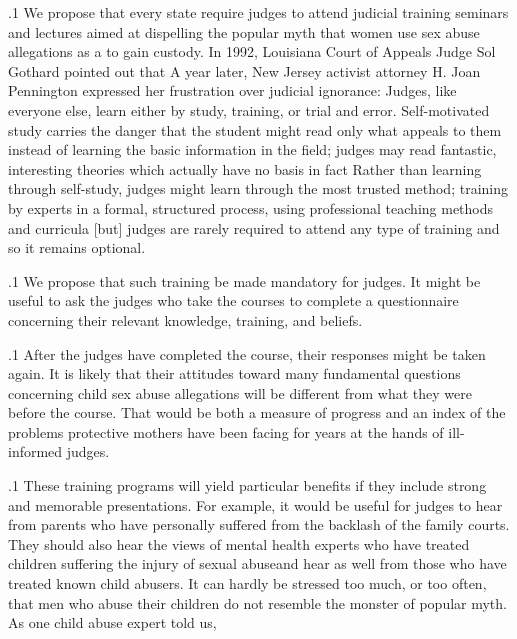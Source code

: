 \documentclass[11pt, twoside]{article}
\begin{document}
{\p.1{%
\noindent{}We propose that every state require judges to attend judicial training
seminars and lectures aimed at dispelling the popular myth that women
use sex abuse allegations as a  to gain custody. In 1992,
Louisiana Court of Appeals Judge Sol Gothard pointed out that  A year later, New Jersey activist
attorney H. Joan Pennington
expressed her frustration over judicial ignorance:
Judges, like everyone else, learn either by study, training, or trial
and error. Self-motivated study carries the danger that the student
might read only what appeals to them instead of learning the basic information in the field; judges may read fantastic, interesting
theories which actually have no basis in fact\ellFour{2pt}{2pt} Rather than
learning through self-study, judges might learn through the most
trusted method; training by experts in a formal, structured process,
using professional teaching methods and curricula [but] judges are
rarely required to attend any type of training and so it remains
optional. \enlargethispage{1em}
}%

\p.1{%
We propose that such training be made mandatory for judges. It
might be useful to ask the judges who take the courses to complete
a questionnaire concerning their relevant knowledge, training, and
beliefs.
}%

\p.1{%
After the judges have completed the course, their responses might be
taken again. It is likely that their attitudes toward many fundamental
questions concerning child sex abuse allegations will be different from
what they were before the course. That would be both a measure of
progress and an index of the problems protective mothers have been
facing for years at the hands of ill-informed judges.
}%

\p.1{%
These training programs will yield particular benefits if they include
strong and memorable presentations. For example, it would be useful
for judges to hear from parents who have personally suffered from the
backlash of the family courts. They should also hear the views of mental
health experts who have treated children suffering the injury of sexual abuse\mdash{}and hear as well from those who have treated known child
abusers. It can hardly be stressed too much, or too often, that men who
abuse their children do not resemble the monster of popular myth. As
one child abuse expert told us, 
}%


}
\end{document}
